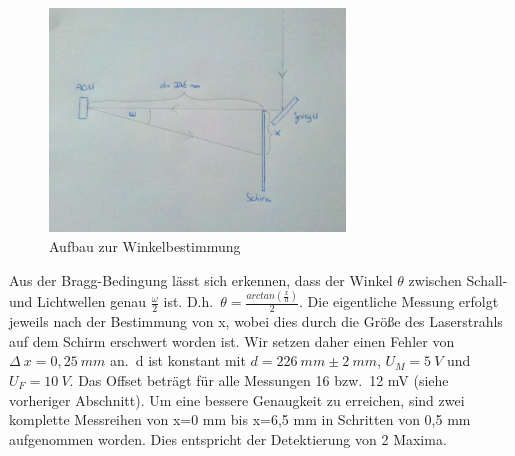 \documentclass[bigchapter,colorback,accentcolor=tud4b,linedtoc,11pt]{tudreport}
\begin{document}
\begin{figure}[H] 
  \centering
     \includegraphics[width=0.7\textwidth]{img/omega-bestimmung.jpg}
  \caption[Cap for listoffigures]{Aufbau zur Winkelbestimmung}
  \label{fig:Bild1}
\end{figure}

Aus der Bragg-Bedingung lässt sich erkennen, dass der Winkel $\theta$ zwischen Schall- und Lichtwellen genau $\frac{\omega}{2}$ ist. D.h.\ $\theta = \frac{arc tan (\frac{x}{d})}{2}$. Die eigentliche Messung erfolgt jeweils nach der Bestimmung von x, wobei dies durch die Größe des Laserstrahls auf dem Schirm erschwert worden ist. Wir setzen daher einen Fehler von $\Delta~x = 0,25~mm$ an.\ d ist konstant mit $d = 226~mm \pm 2~mm$, $U_M = 5~V$ und $U_F = 10~V$. Das Offset beträgt für alle Messungen 16 bzw.\ 12 mV (siehe vorheriger Abschnitt). Um eine bessere Genaugkeit zu erreichen, sind zwei komplette Messreihen von x=0 mm bis x=6,5 mm in Schritten von 0,5 mm aufgenommen worden. Dies entspricht der Detektierung von 2 Maxima.
\end{document}
